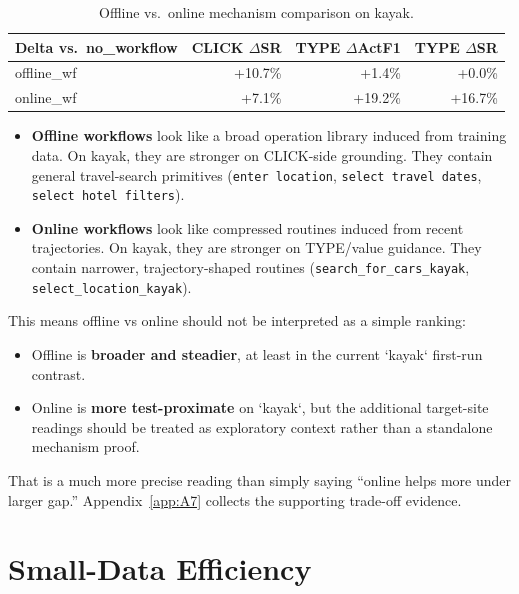 \documentclass{article}
\providecommand{\tightlist}{%
  \setlength{\itemsep}{0pt}\setlength{\parskip}{0.8em}}
\begin{document}
{\begin{longtable}[]{@{}lrrr@{}}
\caption{Offline vs.~online mechanism comparison on kayak.}\label{tab:offline-vs-online-mechanism-comparison-on-kay}\\

\toprule\noalign{}
Delta vs.~no\_workflow & CLICK \ensuremath{\Delta}SR & TYPE \ensuremath{\Delta}ActF1 & TYPE \ensuremath{\Delta}SR \\
\midrule\noalign{}
\endhead
\bottomrule\noalign{}
\endlastfoot
offline\_wf & +10.7\% & +1.4\% & +0.0\% \\
online\_wf & +7.1\% & +19.2\% & +16.7\% \\
\end{longtable}
}

\begin{itemize}
\tightlist
\item
  \textbf{Offline workflows} look like a broad operation library induced
  from training data. On kayak, they are stronger on CLICK-side
  grounding. They contain general travel-search primitives
  (\texttt{enter\ location}, \texttt{select\ travel\ dates},
  \texttt{select\ hotel\ filters}).
\item
  \textbf{Online workflows} look like compressed routines induced from
  recent trajectories. On kayak, they are stronger on
  TYPE/value guidance. They contain narrower, trajectory-shaped routines
  (\texttt{search\_for\_cars\_kayak}, \texttt{select\_location\_kayak}).
\end{itemize}

This means offline vs online should not be interpreted as a simple
ranking:

\begin{itemize}
\tightlist
\item
  Offline is \textbf{broader and steadier}, at least in the current
  `kayak` first-run contrast.
\item
  Online is \textbf{more test-proximate} on `kayak`, but the additional
  target-site readings should be treated as exploratory context rather
  than a standalone mechanism proof.
\end{itemize}

That is a much more precise reading than simply saying ``online helps
more under larger gap.'' Appendix~\ref{app:A7} collects the supporting
trade-off evidence.

\section{Small-Data Efficiency}\label{small-data-efficiency}
\end{document}
